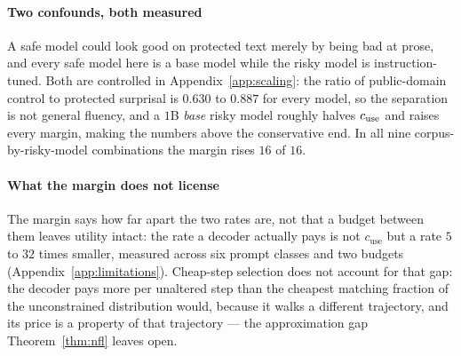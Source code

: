 \paragraph{Two confounds, both measured}
A safe model could look good on protected text merely by being bad at prose, and every safe model
here is a base model while the risky model is instruction-tuned. Both are controlled in
Appendix~\ref{app:scaling}: the ratio of public-domain control to protected surprisal is $0.630$ to
$0.887$ for every model, so the separation is not general fluency, and a $1$B \emph{base} risky
model roughly halves $c_{\rm use}$ and raises every margin, making the numbers above the
conservative end. In all nine corpus-by-risky-model combinations the margin rises $16$ of $16$.

\paragraph{What the margin does not license}\label{sec:price}
The margin says how far apart the two rates are, not that a budget between them leaves utility
intact: the rate a decoder actually pays is not $c_{\mathrm{use}}$ but a rate $5$ to $32$ times
smaller, measured across six prompt classes and two budgets (Appendix~\ref{app:limitations}). Cheap-step selection does not account for that gap: the decoder pays more per unaltered step
than the cheapest matching fraction of the unconstrained distribution would, because it walks a
different trajectory, and its price is a property of that trajectory --- the approximation gap
Theorem~\ref{thm:nfl} leaves open.
